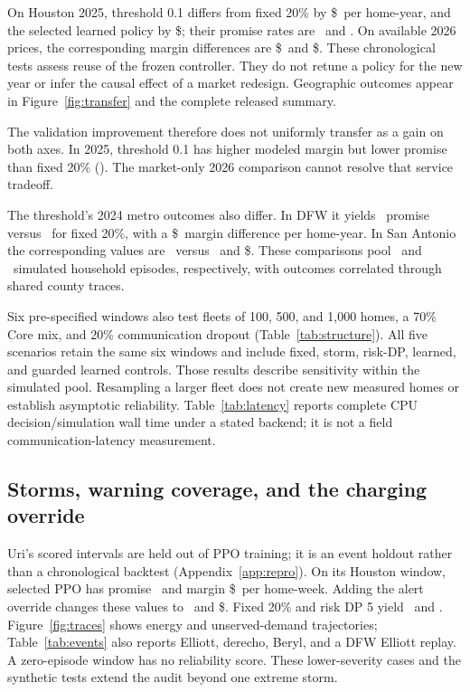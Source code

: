 On Houston 2025, threshold 0.1 differs from fixed 20\% by \$\TestThresholdDelta\ per home-year, and the selected learned policy by \$\TestLearnedDelta; their promise rates are \TestThresholdPromise\ and \TestLearnedPromise. On available 2026 prices, the corresponding margin differences are \$\PartialThresholdDelta\ and \$\PartialLearnedDelta. These chronological tests assess reuse of the frozen controller. They do not retune a policy for the new year or infer the causal effect of a market redesign. Geographic outcomes appear in Figure~\ref{fig:transfer} and the complete released summary.

The validation improvement therefore does not uniformly transfer as a gain on both axes. In 2025, threshold 0.1 has higher modeled margin but lower promise than fixed 20\% (\TestFixedPromise). The market-only 2026 comparison cannot resolve that service tradeoff.

The threshold's 2024 metro outcomes also differ. In DFW it yields \DFWThresholdPromise\ promise versus \DFWFixedPromise\ for fixed 20\%, with a \$\DFWThresholdDelta\ margin difference per home-year. In San Antonio the corresponding values are \SanAntonioThresholdPromise\ versus \SanAntonioFixedPromise\ and \$\SanAntonioThresholdDelta. These comparisons pool \DFWEpisodes\ and \SanAntonioEpisodes\ simulated household episodes, respectively, with outcomes correlated through shared county traces.

Six pre-specified windows also test fleets of 100, 500, and 1,000 homes, a 70\% Core mix, and 20\% communication dropout (Table~\ref{tab:structure}). All five scenarios retain the same six windows and include fixed, storm, risk-DP, learned, and guarded learned controls. Those results describe sensitivity within the simulated pool. Resampling a larger fleet does not create new measured homes or establish asymptotic reliability. Table~\ref{tab:latency} reports complete CPU decision/simulation wall time under a stated backend; it is not a field communication-latency measurement.

\subsection{Storms, warning coverage, and the charging override}

Uri's scored intervals are held out of PPO training; it is an event holdout rather than a chronological backtest (Appendix~\ref{app:repro}). On its Houston window, selected PPO has promise \UriLearnedPromise\ and margin \$\UriLearnedMargin\ per home-week. Adding the alert override changes these values to \UriGuardedPromise\ and \$\UriGuardedMargin. Fixed 20\% and risk DP 5 yield \UriFixedPromise\ and \UriRiskPromise. Figure~\ref{fig:traces} shows energy and unserved-demand trajectories; Table~\ref{tab:events} also reports Elliott, derecho, Beryl, and a DFW Elliott replay. A zero-episode window has no reliability score. These lower-severity cases and the synthetic tests extend the audit beyond one extreme storm.

